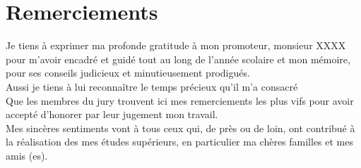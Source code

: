 \documentclass[12pt, a4paper, openany]{report}
\begin{document}
\makeatother



\chapter*{Remerciements}

  Je tiens à exprimer ma profonde gratitude à mon promoteur, monsieur XXXX pour m'avoir encadré et guidé tout au long de l'année scolaire et mon mémoire, pour ses conseils judicieux et minutieusement prodigués.\\
  
  Aussi je tiens à lui reconnaître le temps précieux qu’il m'a consacré \\
  
   Que les membres du jury trouvent ici mes remerciements les plus vifs pour avoir accepté d’honorer par leur jugement mon travail.\\
   
   Mes sincères sentiments vont à tous ceux qui, de près ou de loin, ont contribué à la réalisation des mes études supérieurs, en particulier ma chères familles et mes amis (es).\\
   
   
\end{document}

